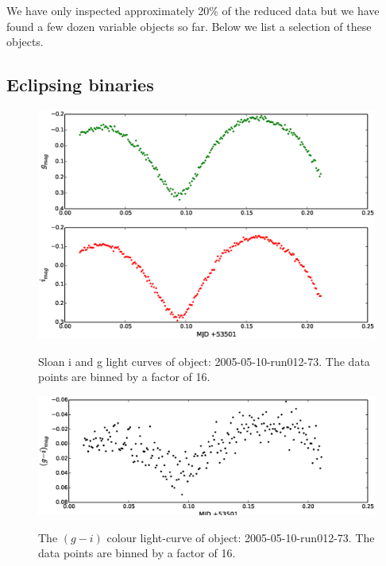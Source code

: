 We have only inspected approximately 20\% of the reduced data but we have found a few dozen variable objects so far. Below we list a selection of these objects. 

\newpage
\subsection{Eclipsing binaries}

  \begin{figure}
    \center
    \includegraphics[width=120mm]{images/2005-05-10-run012-lightcurve-bin16.eps} 
    \label{fig:2005-05-10-run012}
    \caption{Sloan i and g light curves of object: 2005-05-10-run012-73. The data points are binned by a factor of 16. }
  \end{figure}
  
  \begin{figure}
    \center
    \includegraphics[width=120mm]{images/2005-05-10-run012-colourcurve-bin16.eps} 
    \label{fig:2005-05-10-run012-colour}
    \caption{The $(g - i)$ colour light-curve of object: 2005-05-10-run012-73. The data points are binned by a factor of 16. }
  \end{figure}
  

